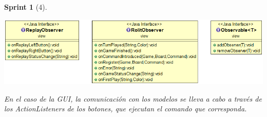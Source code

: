 \documentclass[12pt,a4paper,openright]{book}
\theoremstyle{break}
\newtheorem*{sprint}{Sprint}
\begin{document}
\begin{sprint}[4]
\begin{center}
\includegraphics[scale=0.43]{observadores-sprint4.png}
\end{center}

En el caso de la GUI, la comunicación con los modelos se lleva a cabo a través de los \textit{ActionListeners} de los botones, que ejecutan el comando que corresponda.

\end{sprint}
\end{document}
